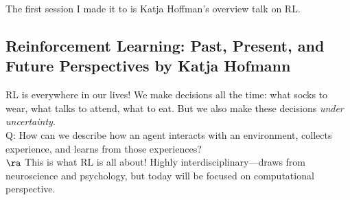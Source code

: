 The first session I made it to is Katja Hoffman's overview talk on RL.

\subsection{Reinforcement Learning: Past, Present, and Future Perspectives by Katja Hofmann}

RL is everywhere in our lives! We make decisions all the time: what socks to wear, what talks to attend, what to eat. But we also make these decisions {\it under uncertainty}. \\

Q: How can we describe how an agent interacts with an environment, collects experience, and learns from those experiences? \\

$\ra$ This is what RL is all about! Highly interdisciplinary---draws from neuroscience and psychology, but today will be focused on computational perspective. \\

